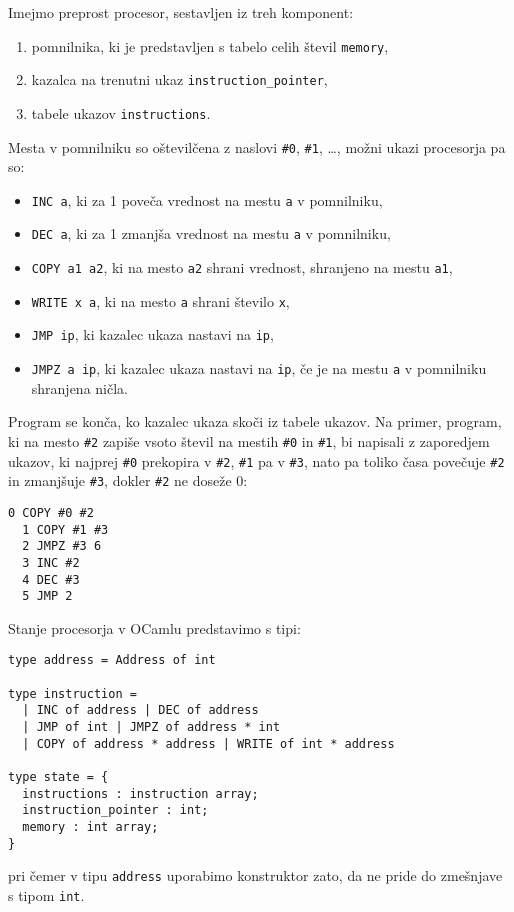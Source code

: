 \documentclass[arhiv]{../izpit}
\begin{document}

\naloga

Imejmo preprost procesor, sestavljen iz treh komponent:
%
\begin{enumerate}
  \setlength\itemsep{0em}
  \item pomnilnika, ki je predstavljen s tabelo celih števil \verb|memory|,
  \item kazalca na trenutni ukaz \verb|instruction_pointer|,
  \item tabele ukazov \verb|instructions|.
\end{enumerate}
%
Mesta v pomnilniku so oštevilčena z naslovi \verb|#0|, \verb|#1|, …, možni ukazi procesorja pa so:
%
\begin{itemize}
  \setlength\itemsep{0em}
  \item \verb|INC a|, ki za 1 poveča vrednost na mestu \verb|a| v pomnilniku,
  \item \verb|DEC a|, ki za 1 zmanjša vrednost na mestu \verb|a| v pomnilniku,
  \item \verb|COPY a1 a2|, ki na mesto \verb|a2| shrani vrednost, shranjeno na mestu \verb|a1|,
  \item \verb|WRITE x a|, ki na mesto \verb|a| shrani število \verb|x|,
  \item \verb|JMP ip|, ki kazalec ukaza nastavi na \verb|ip|,
  \item \verb|JMPZ a ip|, ki kazalec ukaza nastavi na \verb|ip|,
      če je na mestu \verb|a| v pomnilniku shranjena ničla.
\end{itemize}
%
Program se konča, ko kazalec ukaza skoči iz tabele ukazov. Na primer, program, ki na mesto \verb|#2| zapiše vsoto števil na mestih \verb|#0| in \verb|#1|, bi napisali z zaporedjem ukazov, ki najprej \verb|#0| prekopira v \verb|#2|, \verb|#1| pa v \verb|#3|, nato pa toliko časa povečuje \verb|#2| in zmanjšuje \verb|#3|, dokler \verb|#2| ne doseže 0:
%
\begin{Verbatim}[fontsize=\small]
  0 COPY #0 #2
  1 COPY #1 #3
  2 JMPZ #3 6
  3 INC #2
  4 DEC #3
  5 JMP 2
\end{Verbatim}
%
Stanje procesorja v OCamlu predstavimo s tipi:
%
\begin{Verbatim}[fontsize=\small]
type address = Address of int

type instruction =
  | INC of address | DEC of address
  | JMP of int | JMPZ of address * int
  | COPY of address * address | WRITE of int * address

type state = {
  instructions : instruction array;
  instruction_pointer : int;
  memory : int array;
}
\end{Verbatim}
%
pri čemer v tipu \verb|address| uporabimo konstruktor zato, da ne pride do zmešnjave s tipom \verb|int|.
\end{document}
